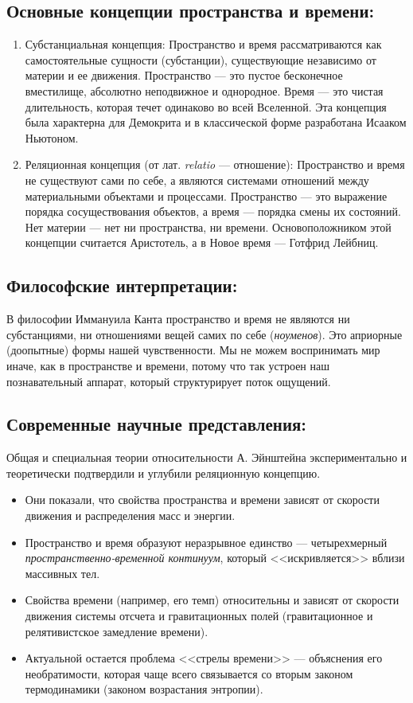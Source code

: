 \documentclass[12pt,a4paper]{article}
\begin{document}
	\subsection{Основные концепции пространства и времени:}
	\begin{enumerate}
		\item Субстанциальная концепция: Пространство и время рассматриваются как самостоятельные сущности (субстанции), существующие независимо от материи и ее движения. Пространство — это пустое бесконечное вместилище, абсолютно неподвижное и однородное. Время — это чистая длительность, которая течет одинаково во всей Вселенной. Эта концепция была характерна для Демокрита и в классической форме разработана Исааком Ньютоном.
		\item Реляционная концепция (от лат. \textit{relatio} — отношение): Пространство и время не существуют сами по себе, а являются системами отношений между материальными объектами и процессами. Пространство — это выражение порядка сосуществования объектов, а время — порядка смены их состояний. Нет материи — нет ни пространства, ни времени. Основоположником этой концепции считается Аристотель, а в Новое время — Готфрид Лейбниц.
	\end{enumerate}
	
	\subsection{Философские интерпретации:}
	В философии Иммануила Канта пространство и время не являются ни субстанциями, ни отношениями вещей самих по себе (\textit{ноуменов}). Это априорные (доопытные) формы нашей чувственности. Мы не можем воспринимать мир иначе, как в пространстве и времени, потому что так устроен наш познавательный аппарат, который структурирует поток ощущений.
	
	\subsection{Современные научные представления:}
	Общая и специальная теории относительности А. Эйнштейна экспериментально и теоретически подтвердили и углубили реляционную концепцию.
	\begin{itemize}
		\item Они показали, что свойства пространства и времени зависят от скорости движения и распределения масс и энергии.
		\item Пространство и время образуют неразрывное единство — четырехмерный \textit{пространственно-временной континуум}, который <<искривляется>> вблизи массивных тел.
		\item Свойства времени (например, его темп) относительны и зависят от скорости движения системы отсчета и гравитационных полей (гравитационное и релятивистское замедление времени).
		\item Актуальной остается проблема <<стрелы времени>> — объяснения его необратимости, которая чаще всего связывается со вторым законом термодинамики (законом возрастания энтропии).
	\end{itemize}
	
\end{document}
